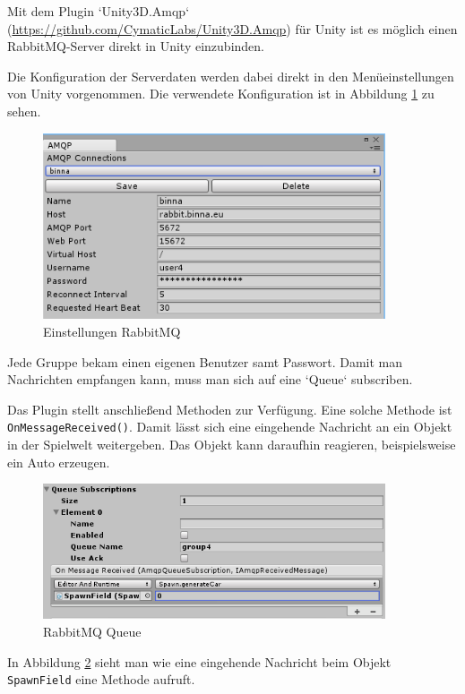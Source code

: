 Mit dem Plugin `Unity3D.Amqp` (\url{https://github.com/CymaticLabs/Unity3D.Amqp}) für Unity ist es möglich einen RabbitMQ-Server direkt in Unity einzubinden.

Die Konfiguration der Serverdaten werden dabei direkt in den Menüeinstellungen von Unity vorgenommen. Die verwendete Konfiguration ist in Abbildung \ref{img:rabbit} zu sehen.

\begin{figure}[H]
\begin{center}
	\includegraphics[width=0.9\textwidth]{BilderAllgemein/rabbitconfig.png}
\end{center}

	\caption{Einstellungen RabbitMQ}

	\label{img:rabbit}
\end{figure}

Jede Gruppe bekam einen eigenen Benutzer samt Passwort. Damit man Nachrichten empfangen kann, muss man sich auf eine `Queue` subscriben.

Das Plugin stellt anschließend Methoden zur Verfügung. Eine solche Methode ist \texttt{OnMessageReceived()}. Damit lässt sich eine eingehende Nachricht an ein Objekt in der Spielwelt weitergeben. Das Objekt kann daraufhin reagieren, beispielsweise ein Auto erzeugen.

\begin{figure}[H]
\begin{center}
	\includegraphics[width=0.9\textwidth]{BilderAllgemein/rabbitqueue.png}
\end{center}

	\caption{RabbitMQ Queue}

	\label{img:rabbitq}
\end{figure}

In Abbildung \ref{img:rabbitq} sieht man wie eine eingehende Nachricht beim Objekt \texttt{SpawnField} eine Methode aufruft.